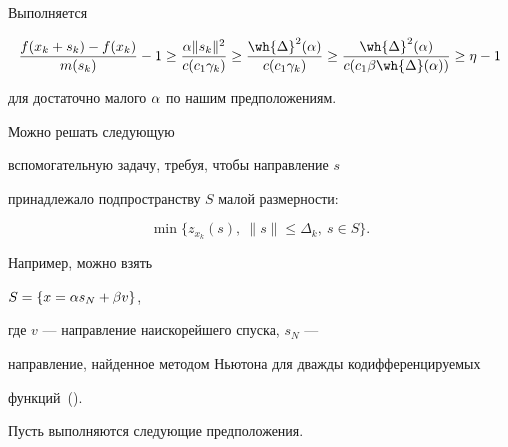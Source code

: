




\begin{pf}


Выполняется


$$


\frac{f(x_k+s_k)-f(x_k)}{m(s_k)} - 1 \geq \frac{\ga


\|s_k\|^2}{c(c_1 \gamma_k)} 


\geq \frac{\wh{\Delta}^2


(\ga)}{c(c_1 \gamma_k)} \geq 


\frac{\wh{\Delta}^2


(\ga)}{c(c_1 \gb \wh{\Delta} (\ga))} \geq \eta - 1


$$


для достаточно малого $\alpha$ по нашим предположениям.


\end{pf}





Можно решать следующую


вспомогательную задачу, требуя, чтобы направление $s$


принадлежало подпространству $S$ малой размерности:


$$


\min \{z_{x_{k}} (s), \ \|s\| \leq \Delta_k, \ s \in S\}.


$$


Например, можно взять


$S = \{ x = \alpha s_N + \beta v \}$,


где $v$ --- направление наискорейшего спуска, $s_N$ ---


направление, найденное методом Ньютона для дважды кодифференцируемых


функций~(\cite{demrub}).





Пусть выполняются следующие предположения.


